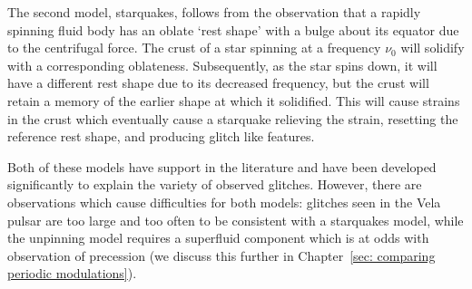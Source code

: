 The second model, starquakes, follows from the observation that a rapidly
spinning fluid body has an oblate `rest shape' with a bulge about its equator
due to the centrifugal force. The crust of a star spinning at a frequency $\nu_0$
will solidify with a corresponding oblateness. Subsequently, as the star spins down,
it will have a different rest shape due to its decreased frequency, but the crust
will retain a memory of the earlier shape at which it solidified. This will cause
strains in the crust which eventually cause a starquake relieving the strain,
resetting the reference rest shape, and producing glitch like features.

Both of these models have support in the literature and have been developed
significantly to explain the variety of observed glitches. However, there are
observations which cause difficulties for both models: glitches seen in the
Vela pulsar are too large and too often to be consistent with a starquakes
model, while the unpinning model requires a superfluid component which is at
odds with observation of precession (we discuss this further in
Chapter~\ref{sec: comparing periodic modulations}).


